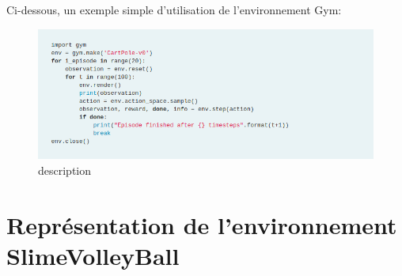 \documentclass[11pt, a4paper]{article}
\begin{document}
Ci-dessous, un exemple simple d'utilisation de l'environnement Gym: \\

\begin{figure}[H]
    \centering
    \includegraphics[scale=0.5]{../images/gym_example.png}
    \caption {description\cite{openaigymGit}}
\end{figure}



\section{Représentation de l'environnement SlimeVolleyBall} 
\end{document}

